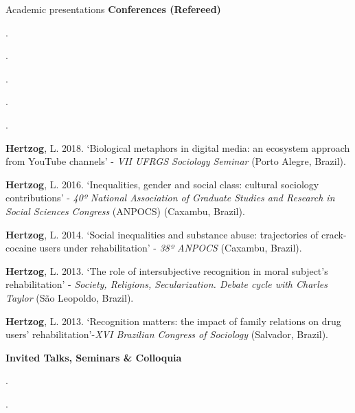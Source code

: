 \begin{rSection}{Academic presentations}
\hspace{2em}\large \textbf{Conferences (Refereed)}
\vspace{1em}
\begin{etaremune}
\item {}
\item {}.
\item {}.
\item {}.
\item {}.
\item {}.

\item \textbf{Hertzog}, L. 2018. ‘Biological metaphors in digital media: an ecosystem approach from YouTube channels’ - \textit{VII UFRGS Sociology Seminar} (Porto Alegre, Brazil).

\item \textbf{Hertzog}, L. 2016. ‘Inequalities, gender and social class: cultural sociology contributions’ - \textit{40º National Association of Graduate Studies and Research in Social Sciences Congress} (ANPOCS) (Caxambu, Brazil).

\item \textbf{Hertzog}, L. 2014. ‘Social inequalities and substance abuse: trajectories of crack-cocaine users under rehabilitation’ - \textit{38º ANPOCS} (Caxambu, Brazil).

\item \textbf{Hertzog}, L. 2013. ‘The role of intersubjective recognition in moral subject's rehabilitation’ - \textit{Society, Religions, Secularization. Debate cycle with Charles Taylor} (São Leopoldo, Brazil).

\item \textbf{Hertzog}{, L. 2013. ‘Recognition matters: the impact of family relations on drug users’ rehabilitation’-}\textit{XVI Brazilian Congress of Sociology} (Salvador, Brazil).
\end{etaremune}

\vspace{1em}
\large  {\textbf{Invited Talks, Seminars \& Colloquia}}
\vspace{1em}

\begin{etaremune}
\item {}.
\item {}.


\end{etaremune}
\end{rSection}
